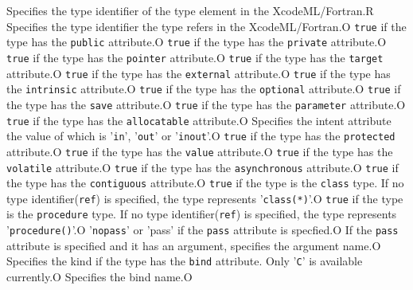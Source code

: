 \begin{XcodeMLAttributes}
{Specifies the type identifier of the type element in the XcodeML/Fortran.}{R}
{Specifies the type identifier the type refers in the XcodeML/Fortran.}{O}
{{\tt true} if the type has the {\tt public} attribute.}{O}
{{\tt true} if the type has the {\tt private} attribute.}{O}
{{\tt true} if the type has the {\tt pointer} attribute.}{O}
{{\tt true} if the type has the {\tt target} attribute.}{O}
{{\tt true} if the type has the {\tt external} attribute.}{O}
{{\tt true} if the type has the {\tt intrinsic} attribute.}{O}
{{\tt true} if the type has the {\tt optional} attribute.}{O}
{{\tt true} if the type has the {\tt save} attribute.}{O}
{{\tt true} if the type has the {\tt parameter} attribute.}{O}
{{\tt true} if the type has the {\tt allocatable} attribute.}{O}
{Specifies the intent attribute the value of which is '{\tt in}', '{\tt out}' or '{\tt inout}'.}{O}
{{\tt true} if the type has the {\tt protected} attribute.}{O}
{{\tt true} if the type has the {\tt value} attribute.}{O}
{{\tt true} if the type has the {\tt volatile} attribute.}{O}
{{\tt true} if the type has the {\tt asynchronous} attribute.}{O}
{{\tt true} if the type has the {\tt contiguous} attribute.}{O}
{{\tt true} if the type is the {\tt class} type. If no type identifier({\tt ref}) is specified, the type represents '{\tt class(*)}'.}{O}
{{\tt true} if the type is the {\tt procedure} type. If no type identifier({\tt ref}) is specified, the type represents '{\tt procedure()}'.}{O}
{'{\tt nopass}' or 'pass' if the {\tt pass} attribute is specfied.}{O}
{If the {\tt pass} attribute is specified and it has an argument, specifies the argument name.}{O}
{Specifies the kind if the type has the {\tt bind} attribute. Only '{\tt C}' is available currently.}{O}
{Specifies the bind name.}{O}
\end{XcodeMLAttributes}


